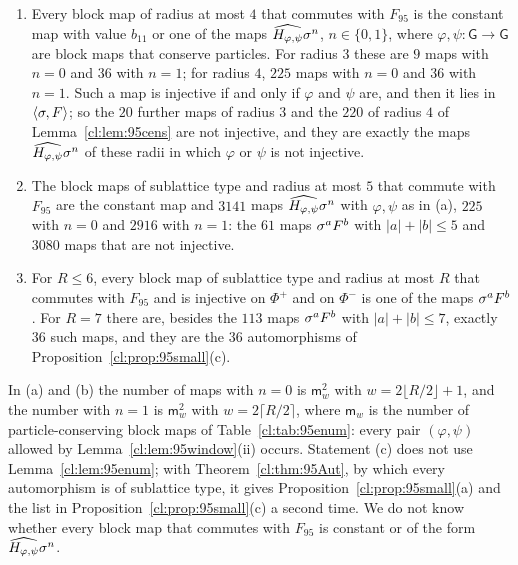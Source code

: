 \begin{proposition}\label{cl:prop:95census}
\leavevmode
\begin{enumerate}
\item[(a)] Every block map of radius at most $4$ that commutes with $F_{95}$ is the constant map with value $b_{11}$ or one of the maps $\widehat{H_{\varphi,\psi}}\sigma^n$, $n\in\{0,1\}$, where $\varphi,\psi\colon\mathsf G\to\mathsf G$ are block maps that conserve particles. For radius $3$ these are $9$ maps with $n=0$ and $36$ with $n=1$; for radius $4$, $225$ maps with $n=0$ and $36$ with $n=1$. Such a map is injective if and only if $\varphi$ and $\psi$ are, and then it lies in $\langle\sigma,F\rangle$; so the $20$ further maps of radius $3$ and the $220$ of radius $4$ of Lemma~\ref{cl:lem:95cens} are not injective, and they are exactly the maps $\widehat{H_{\varphi,\psi}}\sigma^n$ of these radii in which $\varphi$ or $\psi$ is not injective.
\item[(b)] The block maps of sublattice type and radius at most $5$ that commute with $F_{95}$ are the constant map and $3141$ maps $\widehat{H_{\varphi,\psi}}\sigma^n$ with $\varphi,\psi$ as in (a), $225$ with $n=0$ and $2916$ with $n=1$: the $61$ maps $\sigma^aF^b$ with $|a|+|b|\le5$ and $3080$ maps that are not injective.
\item[(c)] For $R\le6$, every block map of sublattice type and radius at most $R$ that commutes with $F_{95}$ and is injective on $\Phi^+$ and on $\Phi^-$ is one of the maps $\sigma^aF^b$. For $R=7$ there are, besides the $113$ maps $\sigma^aF^b$ with $|a|+|b|\le7$, exactly $36$ such maps, and they are the $36$ automorphisms of Proposition~\ref{cl:prop:95small}(c).
\end{enumerate}
\end{proposition}

In (a) and (b) the number of maps with $n=0$ is $\mathsf m_w^2$ with $w=2\lfloor R/2\rfloor+1$, and the number with $n=1$ is $\mathsf m_w^2$ with $w=2\lceil R/2\rceil$, where $\mathsf m_w$ is the number of particle-conserving block maps of Table~\ref{cl:tab:95enum}: every pair $(\varphi,\psi)$ allowed by Lemma~\ref{cl:lem:95window}(ii) occurs. Statement (c) does not use Lemma~\ref{cl:lem:95enum}; with Theorem~\ref{cl:thm:95Aut}, by which every automorphism is of sublattice type, it gives Proposition~\ref{cl:prop:95small}(a) and the list in Proposition~\ref{cl:prop:95small}(c) a second time. We do not know whether every block map that commutes with $F_{95}$ is constant or of the form $\widehat{H_{\varphi,\psi}}\sigma^n$.

